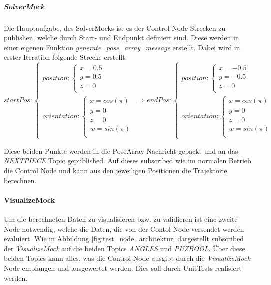 \subparagraph{SolverMock}
Die Hauptaufgabe, des SolverMocks ist es der Control Node Strecken zu publishen, welche durch Start- und Endpunkt definiert sind. Diese werden in einer eigenen Funktion \textit{generate\_pose\_array\_message} erstellt. Dabei wird in erster Iteration folgende Strecke erstellt. 
\[ 
startPos: 
    \begin{cases} 
    position: 
    \begin{cases}
    x = 0.5 \\
    y = 0.5 \\
    z = 0 \\
    \end{cases}\\
    orientation: 
    \begin{cases}
    x = cos(\pi{}) \\
    y = 0 \\
    z = 0 \\
    w = sin(\pi{}) \\
    \end{cases}
    \end{cases}
    \Rightarrow 
endPos: 
    \begin{cases} 
    position: 
    \begin{cases}
    x = -0.5 \\
    y = -0.5 \\
    z = 0 \\
    \end{cases}\\
    orientation: 
    \begin{cases}
    x = cos(\pi{}) \\
    y = 0 \\
    z = 0 \\
    w = sin(\pi{}) \\
    \end{cases}
    \end{cases}
\]

Diese beiden Punkte werden in die PoseArray Nachricht gepackt und an das \textit{NEXTPIECE} Topic gepublished. Auf dieses subscribed wie im normalen Betrieb die Control Node und kann aus den jeweiligen Positionen die Trajektorie berechnen.

\paragraph{VisualizeMock}
Um die berechneten Daten zu visualisieren bzw. zu validieren ist eine zweite Node notwendig, welche die Daten, die von der Contol Node versendet werden evaluiert. Wie in Abbildung \ref{fig:test_node_architektur} dargestellt subscribed der \textit{VisualizeMock} auf die beiden Topics \textit{ANGLES} und \textit{PUZBOOL}. Über diese beiden Topics kann alles, was die Control Node ausgibt durch die \textit{VisualizeMock} Node empfangen und ausgewertet werden. Dies soll durch UnitTests realisiert werden.   

